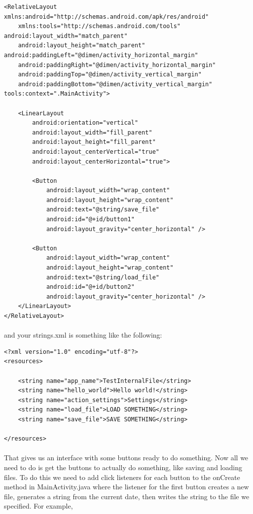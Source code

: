 \begin{lstlisting}
<RelativeLayout xmlns:android="http://schemas.android.com/apk/res/android"
    xmlns:tools="http://schemas.android.com/tools" android:layout_width="match_parent"
    android:layout_height="match_parent" android:paddingLeft="@dimen/activity_horizontal_margin"
    android:paddingRight="@dimen/activity_horizontal_margin"
    android:paddingTop="@dimen/activity_vertical_margin"
    android:paddingBottom="@dimen/activity_vertical_margin" tools:context=".MainActivity">

    <LinearLayout
        android:orientation="vertical"
        android:layout_width="fill_parent"
        android:layout_height="fill_parent"
        android:layout_centerVertical="true"
        android:layout_centerHorizontal="true">

        <Button
            android:layout_width="wrap_content"
            android:layout_height="wrap_content"
            android:text="@string/save_file"
            android:id="@+id/button1"
            android:layout_gravity="center_horizontal" />

        <Button
            android:layout_width="wrap_content"
            android:layout_height="wrap_content"
            android:text="@string/load_file"
            android:id="@+id/button2"
            android:layout_gravity="center_horizontal" />
    </LinearLayout>
</RelativeLayout>
\end{lstlisting}

\paragraph{} and your strings.xml is something like the following:

\begin{lstlisting}
<?xml version="1.0" encoding="utf-8"?>
<resources>

    <string name="app_name">TestInternalFile</string>
    <string name="hello_world">Hello world!</string>
    <string name="action_settings">Settings</string>
    <string name="load_file">LOAD SOMETHING</string>
    <string name="save_file">SAVE SOMETHING</string>

</resources>
\end{lstlisting}

\paragraph{} That gives us an interface with some buttons ready to do something. Now all we need to do is get the buttons to actually do something, like saving and loading files. To do this we need to add click listeners for each button to the onCreate method in MainActivity.java where the listener for the first button creates a new file, generates a string from the current date, then writes the string to the file we specified. For example, 

